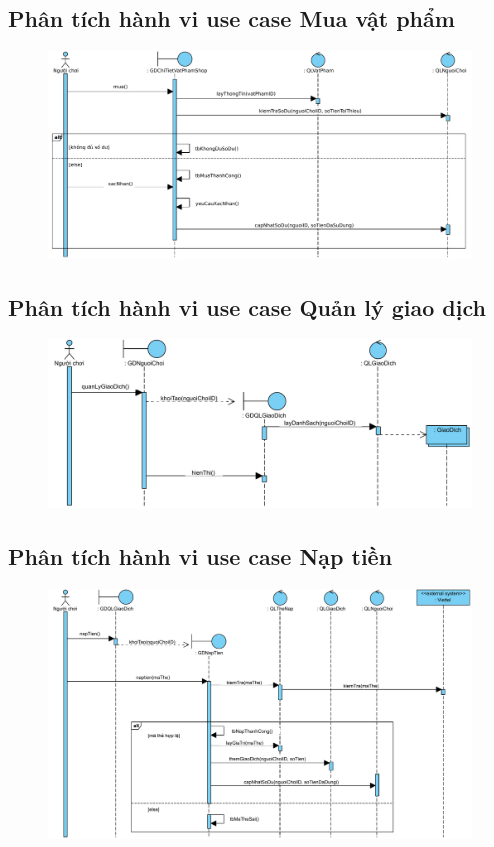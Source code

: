 \documentclass[3p]{elsarticle}
\begin{document}
\subsection{Phân tích hành vi use case Mua vật phẩm}
\begin{figure}[!htbp]
	\hspace*{-.5in}
	\centering
	\includegraphics[scale=.55]{images/sequence-pdfs/gamer/ShopManagement_BuyItem.pdf}
\end{figure}
\newpage


\subsection{Phân tích hành vi use case Quản lý giao dịch}
\begin{figure}[!htbp]
	\hspace*{-.5in}
	\centering
	\includegraphics[scale=.55]{images/sequence-pdfs/gamer/TransactionManagement.pdf}
\end{figure}

\subsection{Phân tích hành vi use case Nạp tiền}
\begin{figure}[!htbp]
	\hspace*{-.5in}
	\centering
	\includegraphics[scale=.55]{images/sequence-pdfs/gamer/TransactionManagement_Recharge.pdf}
\end{figure}
\end{document}

